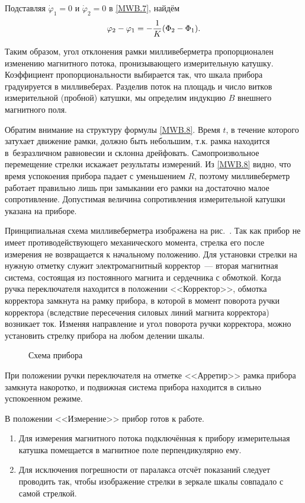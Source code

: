 Подставляя $\dot{\varphi}_1=0$ и $\dot{\varphi}_2=0$ в \eqref{MWB.7}, найдём
\begin{equation}
	\varphi_2-\varphi_1=-\frac{1}{K}(\Phi_2-\Phi_1).
	\eqmark{MWB.9}
\end{equation}

Таким образом, угол отклонения рамки милливеберметра пропорционален изменению магнитного потока, пронизывающего измерительную катушку. Коэффициент пропорциональности выбирается так, что шкала прибора градуируется в милливеберах. Разделив поток на площадь и число витков измерительной (пробной) катушки, мы определим индукцию $B$ внешнего магнитного поля.

Обратим внимание на структуру формулы \eqref{MWB.8}. Время $t$, в течение которого затухает движение рамки, должно быть небольшим, т.к. рамка находится в~безразличном равновесии и склонна дрейфовать. Самопроизвольное перемещение стрелки искажает результаты измерений. Из \eqref{MWB.8} видно, что время успокоения прибора падает с уменьшением $R$, поэтому милливеберметр работает правильно лишь при замыкании его рамки на достаточно малое сопротивление. Допустимая величина сопротивления измерительной катушки указана на приборе.

Принципиальная схема милливеберметра изображена на рис.~. Так как прибор не имеет противодействующего механического момента, стрелка его после измерения не возвращается к начальному положению. Для установки стрелки на нужную отметку служит электромагнитный корректор~--- вторая магнитная система, состоящая из постоянного магнита и сердечника с обмоткой. Когда ручка переключателя находится в положении <<Корректор>>, обмотка корректора замкнута на рамку прибора, в которой в момент поворота ручки корректора (вследствие пересечения силовых линий магнита корректора) возникает ток.
Изменяя направление и угол поворота ручки корректора, можно установить стрелку прибора на любом делении шкалы.\
\begin{figure}[h!]
	\caption{Схема прибора}
\end{figure}
При положении ручки переключателя на отметке <<Арретир>> рамка прибора замкнута накоротко, и подвижная система прибора находится в сильно успокоенном режиме.

В положении <<Измерение>> прибор готов к работе.



\begin{enumerate}

\item{Для измерения магнитного потока подключённая к прибору измерительная катушка помещается в магнитное поле перпендикулярно ему.}

\item{Для исключения погрешности от паралакса отсчёт показаний следует проводить так, чтобы изображение стрелки в зеркале шкалы совпадало с самой стрелкой.}
\end{enumerate}

